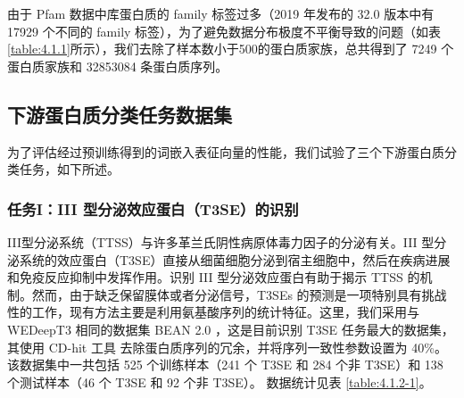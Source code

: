 由于 Pfam 数据中库蛋白质的 family 标签过多（2019 年发布的 32.0 版本中有 17929 个不同的 family 标签），为了避免数据分布极度不平衡导致的问题（如表 \ref{table:4.1.1}所示），我们去除了样本数小于500的蛋白质家族，总共得到了 7249 个蛋白质家族和 32853084 条蛋白质序列。

\begin{table}[!htbp]
\centering
{}
\label{table:4.1.1}
\end{table}


\subsection{下游蛋白质分类任务数据集}
为了评估经过预训练得到的词嵌入表征向量的性能，我们试验了三个下游蛋白质分类任务，如下所述。

\subsubsection{任务I：III 型分泌效应蛋白（T3SE）的识别}

III型分泌系统（TTSS）与许多革兰氏阴性病原体毒力因子的分泌有关。III 型分泌系统的效应蛋白（T3SE）直接从细菌细胞分泌到宿主细胞中，然后在疾病进展和免疫反应抑制中发挥作用。识别 III 型分泌效应蛋白有助于揭示 TTSS 的机制。然而，由于缺乏保留膜体或者分泌信号，T3SEs 的预测是一项特别具有挑战性的工作，现有方法主要是利用氨基酸序列的统计特征。这里，我们采用与 WEDeepT3 \cite{fu2019wedeept3} 相同的数据集 BEAN 2.0 \cite{dong2015bean}，这是目前识别 T3SE 任务最大的数据集，其使用 CD-hit 工具 \cite{li2006cd} 去除蛋白质序列的冗余，并将序列一致性参数设置为 40\%。该数据集中一共包括 525 个训练样本（241 个 T3SE 和 284 个非 T3SE）和 138 个测试样本（46 个 T3SE 和 92 个非 T3SE）。 数据统计见表 \ref{table:4.1.2-1}。

\begin{table}[!htbp]
\centering
{}
\label{table:4.1.2-1}
\end{table}

